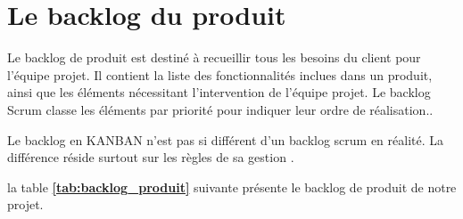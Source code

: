   \section{Le backlog du produit}
\par Le backlog de produit est destiné à recueillir tous les besoins du client pour l'équipe projet. Il contient la liste des fonctionnalités inclues dans un produit, ainsi que les éléments nécessitant l'intervention de l'équipe projet. Le backlog Scrum classe les éléments par priorité pour indiquer leur ordre de réalisation.\cite{blog}.

 \par Le backlog en KANBAN n'est pas si différent d'un backlog scrum en réalité. La différence réside surtout sur les règles de sa gestion \cite{BPK}.  
    
    \par la table \textbf{\ref{tab:backlog_produit}} suivante présente le backlog de produit de notre projet. 
